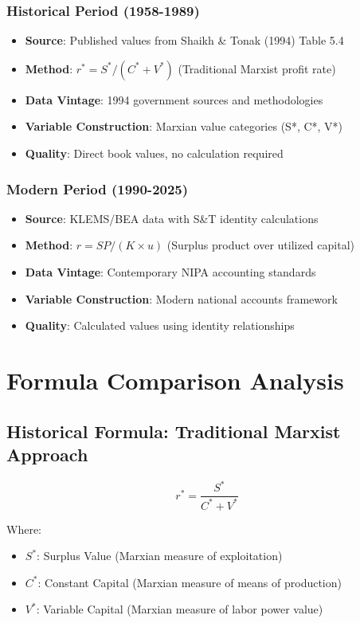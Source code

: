 \documentclass[12pt]{article}
\begin{document}
\subsubsection{Historical Period (1958-1989)}
\begin{itemize}
    \item \textbf{Source}: Published values from Shaikh \& Tonak (1994) Table 5.4
    \item \textbf{Method}: $r^* = S^*/(C^* + V^*)$ (Traditional Marxist profit rate)
    \item \textbf{Data Vintage}: 1994 government sources and methodologies
    \item \textbf{Variable Construction}: Marxian value categories (S*, C*, V*)
    \item \textbf{Quality}: Direct book values, no calculation required
\end{itemize}

\subsubsection{Modern Period (1990-2025)}
\begin{itemize}
    \item \textbf{Source}: KLEMS/BEA data with S\&T identity calculations
    \item \textbf{Method}: $r = SP/(K \times u)$ (Surplus product over utilized capital)
    \item \textbf{Data Vintage}: Contemporary NIPA accounting standards
    \item \textbf{Variable Construction}: Modern national accounts framework
    \item \textbf{Quality}: Calculated values using identity relationships
\end{itemize}

\section{Formula Comparison Analysis}

\subsection{Historical Formula: Traditional Marxist Approach}

\begin{equation}
r^* = \frac{S^*}{C^* + V^*}
\end{equation}

Where:
\begin{itemize}
    \item $S^*$: Surplus Value (Marxian measure of exploitation)
    \item $C^*$: Constant Capital (Marxian measure of means of production)
    \item $V^*$: Variable Capital (Marxian measure of labor power value)
\end{itemize}
\end{document}
